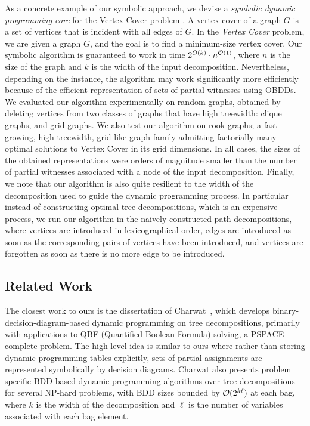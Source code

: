 As a concrete example of our symbolic approach, we devise a \emph{symbolic dynamic programming core} for the {\sc Vertex Cover} problem \cite{chen2024vertex,cai2017finding}. A vertex cover of a graph $G$ is a set of vertices that is incident with all edges of $G$. In the {\em Vertex Cover} problem, we are given a graph $G$, and the goal is to find a minimum-size vertex cover. Our symbolic algorithm is guaranteed to work in time $2^{O(k)}\cdot n^{\mathcal{O}(1)}$, where $n$ is the size of the graph and $k$ is the width of the input decomposition. Nevertheless, depending on the instance, the algorithm may work significantly more efficiently because of the efficient representation of sets of partial witnesses using OBDDs. We evaluated our algorithm experimentally on random graphs, obtained by deleting vertices from two classes of graphs that have high treewidth: clique graphs, and grid graphs. We also test our algorithm on rook graphs; a fast growing, high treewidth, grid-like graph family admitting factorially many optimal solutions to {\sc Vertex Cover} in its grid dimensions. In all cases, the sizes of the obtained representations were orders of magnitude smaller than the number of partial witnesses associated with a node of the input decomposition. Finally, we note that our algorithm is also quite resilient to the width of the decomposition used to guide the dynamic programming process. In particular instead of constructing optimal tree decompositions, which is an expensive process, we run our algorithm in the naively constructed path-decompositions, where vertices are introduced in lexicographical order, edges are introduced as soon as the corresponding pairs of vertices have been introduced, and vertices are forgotten as soon as there is no more edge to be introduced. 

\subsection{Related Work}

The closest work to ours is the dissertation of Charwat~\cite{Charwat2017BDD},
which develops binary-decision-diagram-based dynamic programming on tree
decompositions, primarily with applications to QBF (Quantified Boolean Formula)
solving, a PSPACE-complete problem. The high-level idea is similar to ours where
rather than storing dynamic-programming tables explicitly, sets of partial
assignments are represented symbolically by decision diagrams. Charwat also
presents problem specific BDD-based dynamic programming algorithms over tree decompositions for
several NP-hard problems, with BDD sizes bounded by $\mathcal{O}(2^{k\ell})$ at each
bag, where $k$ is the width of the decomposition and $\ell$ is the number of
variables associated with each bag element.

